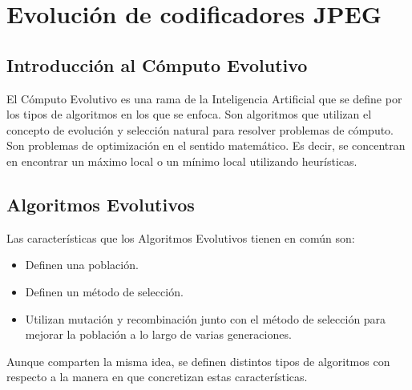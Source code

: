 
\chapter{Evolución de codificadores JPEG}\label{ch:resultados_evolucion}

\section{Introducción al Cómputo Evolutivo}

El \gls{Cómputo Evolutivo} es una rama de la Inteligencia Artificial que se define
por los tipos de algoritmos en los que se enfoca. Son algoritmos que utilizan
el concepto de evolución y selección natural para resolver problemas de cómputo. Son
problemas de optimización en el sentido matemático. Es decir, se concentran en
encontrar un máximo local o un mínimo local utilizando heurísticas.

\section{Algoritmos Evolutivos}

Las características que los Algoritmos Evolutivos tienen en común son:

\begin{itemize}
   \item Definen una población.
   \item Definen un método de selección.
   \item Utilizan mutación y recombinación junto con el método de selección para
      mejorar la población a lo largo de varias generaciones.
\end{itemize}

Aunque comparten la misma idea, se definen distintos tipos de algoritmos con
respecto a la manera en que concretizan estas características.

